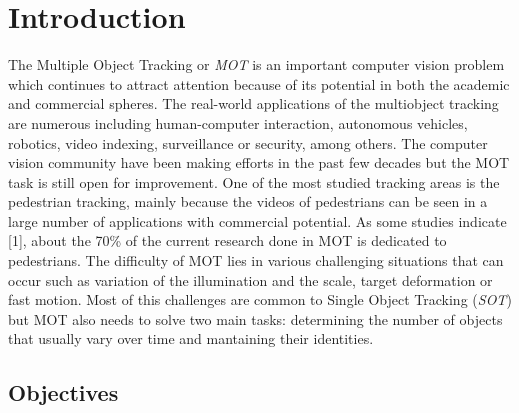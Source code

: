 \chapter{Introduction}\label{cap.introduccion}
\setlength{\parindent}{0pt}
The Multiple Object Tracking or \textit{MOT} is an important computer vision problem which continues to attract attention because of its potential in both the academic and commercial spheres. The real-world applications of the multiobject tracking are numerous including human-computer interaction, autonomous vehicles, robotics, video indexing, surveillance or security, among others. The computer vision community have been making efforts in the past few decades but the MOT task is still open for improvement. One of the most studied tracking areas is the pedestrian tracking, mainly because the videos of pedestrians can be seen in a large number of applications with commercial potential. As some studies indicate [1], about the 70\% of the current research done in MOT is dedicated to pedestrians. The difficulty of MOT lies in various challenging situations that can occur such as variation of the illumination and the scale, target deformation or fast motion. Most of this challenges are common to Single Object Tracking (\textit{SOT}) but MOT also needs to solve two main tasks: determining the number of objects that usually vary over time and mantaining their identities.
\section{Objectives}
